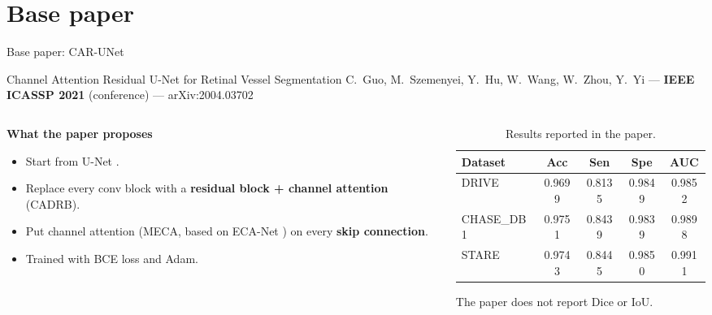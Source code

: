 \documentclass[aspectratio=169,10pt]{beamer}
\begin{document}
\section{Base paper}

\begin{frame}{Base paper: CAR-UNet}
  \begin{block}{Channel Attention Residual U-Net for Retinal Vessel Segmentation}
    C.~Guo, M.~Szemenyei, Y.~Hu, W.~Wang, W.~Zhou, Y.~Yi --- \textbf{IEEE ICASSP 2021} (conference) --- arXiv:2004.03702 \cite{guo2021carunet}
  \end{block}
  \vspace{4pt}
  \begin{columns}[T]
    \begin{column}{0.5\textwidth}
      \textbf{What the paper proposes}
      \begin{itemize}\setlength\itemsep{2pt}
        \item Start from U-Net \cite{ronneberger2015unet}.
        \item Replace every conv block with a \textbf{residual block + channel attention} (CADRB).
        \item Put channel attention (MECA, based on ECA-Net \cite{wang2020eca}) on every \textbf{skip connection}.
        \item Trained with BCE loss and Adam.
      \end{itemize}
    \end{column}
    \begin{column}{0.48\textwidth}
      \begin{table}
        \caption{Results reported in the paper.}
        \scriptsize
        \begin{tabular}{@{}lcccc@{}}
          \toprule
          Dataset & Acc & Sen & Spe & AUC \\
          \midrule
          DRIVE & 0.9699 & 0.8135 & 0.9849 & 0.9852 \\
          CHASE\_DB1 & 0.9751 & 0.8439 & 0.9839 & 0.9898 \\
          STARE & 0.9743 & 0.8445 & 0.9850 & 0.9911 \\
          \bottomrule
        \end{tabular}
      \end{table}
      {\scriptsize The paper does not report Dice or IoU.}
    \end{column}
  \end{columns}
\end{frame}
\end{document}
